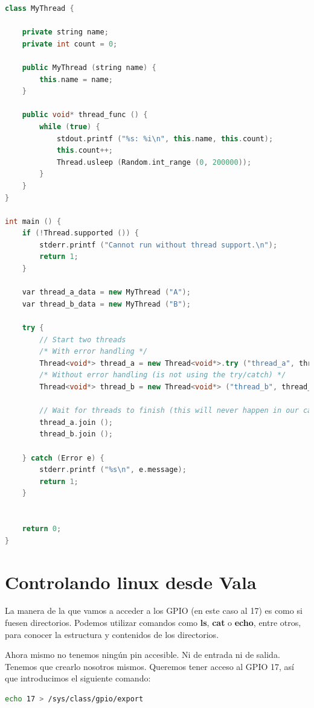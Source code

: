 \documentclass[12pt,twoside]{book}
\begin{document}
\begin{lstlisting}[language=C++]
class MyThread {

    private string name;
    private int count = 0;

    public MyThread (string name) {
        this.name = name;
    }

    public void* thread_func () {
        while (true) {
            stdout.printf ("%s: %i\n", this.name, this.count);
            this.count++;
            Thread.usleep (Random.int_range (0, 200000));
        }
    }
}

int main () {
    if (!Thread.supported ()) {
        stderr.printf ("Cannot run without thread support.\n");
        return 1;
    }

    var thread_a_data = new MyThread ("A");
    var thread_b_data = new MyThread ("B");

    try {
        // Start two threads
        /* With error handling */
        Thread<void*> thread_a = new Thread<void*>.try ("thread_a", thread_a_data.thread_func);
        /* Without error handling (is not using the try/catch) */
        Thread<void*> thread_b = new Thread<void*> ("thread_b", thread_b_data.thread_func);

        // Wait for threads to finish (this will never happen in our case, but anyway)
        thread_a.join ();
        thread_b.join ();

    } catch (Error e) {
        stderr.printf ("%s\n", e.message);
        return 1;
    }


    return 0;
}
\end{lstlisting}
 
\chapter{Controlando linux desde Vala}

La manera de la que vamos a acceder a los GPIO (en este caso al 17) es como si fuesen directorios. Podemos utilizar comandos como \textbf{ls}, \textbf{cat} o \textbf{echo}, entre otros, para conocer la estructura y contenidos de los directorios. 

Ahora mismo no tenemos ningún pin accesible. Ni de entrada ni de salida. Tenemos que crearlo nosotros mismos. Queremos tener acceso al GPIO 17, así que introducimos el siguiente comando: 

\begin{lstlisting}[language=bash]
echo 17 > /sys/class/gpio/export
\end{lstlisting}
\end{document}
